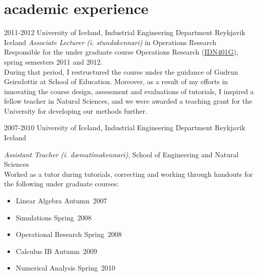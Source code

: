 \documentclass[]{cv} %
\begin{document}
\section{academic experience}
\begin{entrylist}
    \entry
    {2011-2012}
    {University of Iceland, Industrial Engineering Department}
    {Reykjavik Iceland}
    {\emph{Associate Lecturer (i. stundakennari)} in Operations Research \\
        Responsible for the under graduate course Operations Research 
        (\href{https://ugla.hi.is/kennsluskra/index.php?sid=&tab=nam&chapter=namskeid&id=08213020110}{IDN401G}),
         spring semesters 2011 and 2012. \\
        During that period, I restructured the course under the guidance of 
        Gudrun Geirsdottir at School of Education. Moreover, as a result of my 
        efforts in innovating the course design, assessment and evaluations of 
        tutorials, I inspired a fellow teacher in Natural Sciences, and we were 
        awarded a teaching grant for the University for developing our methods 
        further.
    }
\end{entrylist}
\begin{entrylist}
    \entry
    {2007-2010}
    {University of Iceland, Industrial Engineering Department}
    {Reykjavik Iceland}
    {\emph{Assistant Teacher (i. dæmatímakennari)}, School of Engineering and 
    Natural Sciences \\
        Worked as a tutor during tutorials, correcting and working through 
        handouts for the following under graduate courses: 
        \begin{itemize}
            \item Linear Algebra 		\hfill Autumn~2007
            \item Simulations			\hfill Spring~2008
            \item Operational Research 	\hfill Spring~2008
            \item Calculus IB			\hfill Autumn~2009
            \item Numerical Analysis 	\hfill Spring~2010
        \end{itemize}	
    }
\end{entrylist}   
\end{document}

